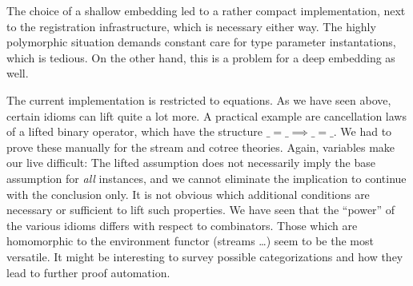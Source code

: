 The choice of a shallow embedding led to a rather compact implementation,
next to the registration infrastructure, which is necessary either way.
The highly polymorphic situation demands constant care for type parameter
instantations, which is tedious.
On the other hand, this is a problem for a deep embedding as well.

The current implementation is restricted to equations.
As we have seen above, certain idioms can lift quite a lot more.
A practical example are cancellation laws of a lifted binary operator, which
have the structure $\_ = \_ \implies \_ = \_$.
We had to prove these manually for the stream and cotree theories.
Again, variables make our live difficult:
The lifted assumption does not necessarily imply the base assumption for
\emph{all} instances, and we cannot eliminate the implication to continue
with the conclusion only.
It is not obvious which additional conditions are necessary or sufficient to
lift such properties.
We have seen that the ``power'' of the various idioms differs with respect to
combinators.
Those which are homomorphic to the environment functor (streams \dots) seem to
be the most versatile.
It might be interesting to survey possible categorizations and how they lead
to further proof automation.
